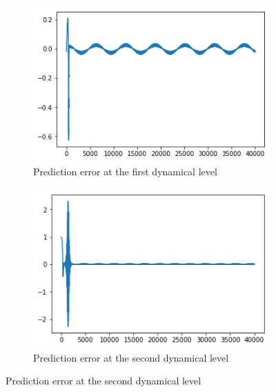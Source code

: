 \begin{figure}[H]
\begin{subfigure}{.32\linewidth}
 \centering
 \includegraphics[width=0.8\linewidth]{chapter_3_figures/dynamics_sine_wave_ez1.png}
 \caption{Prediction error at the first dynamical level}
\end{subfigure}
\hfill
\begin{subfigure}{.32\linewidth}
 \centering
 \includegraphics[width=0.8\linewidth]{chapter_3_figures/dynamics_sine_wave_ez2.png}
 \caption{Prediction error at the second dynamical level}
\end{subfigure}
 

\end{figure}
